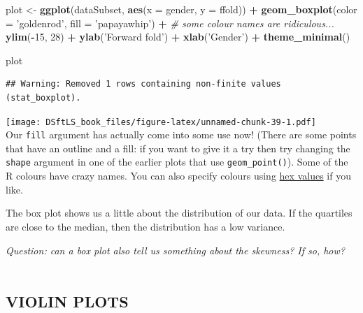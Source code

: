 \documentclass[
]{book}
\newenvironment{Shaded}{\begin{snugshade}}{\end{snugshade}}
\newcommand{\CommentTok}[1]{\textcolor[rgb]{0.56,0.35,0.01}{\textit{#1}}}
\newcommand{\DataTypeTok}[1]{\textcolor[rgb]{0.13,0.29,0.53}{#1}}
\newcommand{\DecValTok}[1]{\textcolor[rgb]{0.00,0.00,0.81}{#1}}
\newcommand{\KeywordTok}[1]{\textcolor[rgb]{0.13,0.29,0.53}{\textbf{#1}}}
\newcommand{\NormalTok}[1]{#1}
\newcommand{\OperatorTok}[1]{\textcolor[rgb]{0.81,0.36,0.00}{\textbf{#1}}}
\newcommand{\StringTok}[1]{\textcolor[rgb]{0.31,0.60,0.02}{#1}}
\begin{document}
\begin{Shaded}
\begin{Highlighting}[]
\NormalTok{plot <-}\StringTok{ }\KeywordTok{ggplot}\NormalTok{(dataSubset, }\KeywordTok{aes}\NormalTok{(}\DataTypeTok{x =}\NormalTok{ gender, }\DataTypeTok{y =}\NormalTok{ ffold)) }\OperatorTok{+}
\StringTok{    }\KeywordTok{geom_boxplot}\NormalTok{(}\DataTypeTok{color =} \StringTok{'goldenrod'}\NormalTok{, }\DataTypeTok{fill =} \StringTok{'papayawhip'}\NormalTok{) }\OperatorTok{+}\StringTok{ }
\StringTok{        }\CommentTok{# some colour names are ridiculous...}
\StringTok{    }\KeywordTok{ylim}\NormalTok{(}\OperatorTok{-}\DecValTok{15}\NormalTok{, }\DecValTok{28}\NormalTok{) }\OperatorTok{+}\StringTok{ }\KeywordTok{ylab}\NormalTok{(}\StringTok{'Forward fold'}\NormalTok{) }\OperatorTok{+}\StringTok{ }\KeywordTok{xlab}\NormalTok{(}\StringTok{'Gender'}\NormalTok{) }\OperatorTok{+}
\StringTok{    }\KeywordTok{theme_minimal}\NormalTok{()}

\NormalTok{plot}
\end{Highlighting}
\end{Shaded}

\begin{verbatim}
## Warning: Removed 1 rows containing non-finite values (stat_boxplot).
\end{verbatim}

\texttt{[image: DSftLS\_book\_files/figure-latex/unnamed-chunk-39-1.pdf]}\\

Our \texttt{fill} argument has actually come into some use now! (There are some
points that have an outline and a fill: if you want to give it a try then try
changing the \texttt{shape} argument in one of the earlier plots that use
\texttt{geom\_point()}). Some of the R colours have crazy names. You can also specify
colours using \href{https://www.w3schools.com/colors/colors_picker.asp}{hex values}
if you like.

The box plot shows us a little about the distribution of our data. If the
quartiles are close to the median, then the distribution has a low variance.

\emph{Question: can a box plot also tell us something about the skewness? If so, how?}\\
~\\

\hypertarget{violin-plots}{%
\subsection{VIOLIN PLOTS}\label{violin-plots}}
\end{document}
